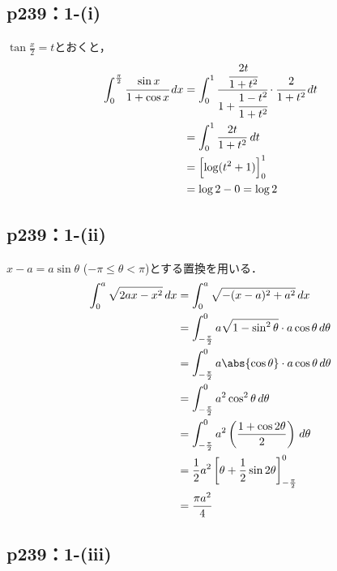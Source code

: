 \documentclass[a4paper,10pt,fleqn]{ltjsarticle}
\begin{document}
\subsection*{p239：1-(i)}

\begin{screen}
	 $\tan \frac{x}{2}=t$とおくと，
	\begin{align*}
		\int_{0}^{\frac{\pi}{2}} \cfrac{\sin x}{1+\cos x} \, dx & = \int_{0}^{1} \cfrac{\cfrac{2t}{1+t^2}}{1+\cfrac{1-t^2}{1+t^2}} \cdot \cfrac{2}{1+t^2} \, dt \\
		& = \int_{0}^{1} \frac{2t}{1+t^2} \, dt \\
		& = \Bigl[\log (t^2+1)\Bigl]_{0}^{1} \\
		& = \log 2-0 = \log 2
	\end{align*}
\end{screen}


\subsection*{p239：1-(ii)}

\begin{screen}
	  $x-a=a \sin \theta$ ($-\pi \le \theta < \pi$)とする置換を用いる．
	\begin{align*}
		\int_{0}^{a} \sqrt{2ax-x^2} \, dx & = \int_{0}^{a} \sqrt{-(x-a)^2+a^2} \, dx \\
		& = \int_{-\frac{\pi}{2}}^{0} a \sqrt{1-\sin ^2 \theta } \cdot a\cos \theta \, d \theta \\
		& = \int_{-\frac{\pi}{2}}^{0} a \abs{\cos \theta} \cdot a\cos \theta \, d \theta \\
		& = \int_{-\frac{\pi}{2}}^{0} a^2 \cos^2 \theta \, d \theta \\
		& = \int_{-\frac{\pi}{2}}^{0} a^2 \left (\frac{1+\cos 2 \theta }{2}\right) \, d \theta \\
		& = \frac{1}{2} a^2 \left [\theta + \frac{1}{2}\sin 2 \theta \right ]_{-\frac{\pi}{2}}^{0} \\
		&= \frac{\pi a^2}{4}
	\end{align*}
\end{screen}


\subsection*{p239：1-(iii)}
\end{document}
